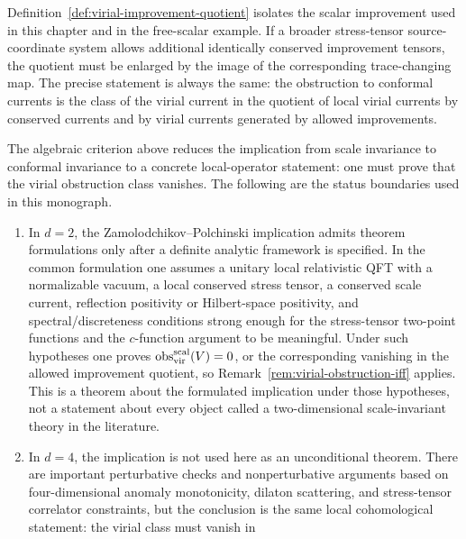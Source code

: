 \begin{remark}
\label{rem:general-improvement-obstruction}
Definition~\ref{def:virial-improvement-quotient} isolates the scalar
improvement used in this chapter and in the free-scalar example.  If a broader
stress-tensor source-coordinate system allows additional identically conserved improvement
tensors, the quotient must be enlarged by the image of the corresponding
trace-changing map.  The precise statement is always the same: the obstruction
to conformal currents is the class of the virial current in the quotient of
local virial currents by conserved currents and by virial currents generated by
allowed improvements.
\end{remark}

\begin{remark}
\label{rem:scale-conformal-dimension-status}
The algebraic criterion above reduces the implication from scale invariance to
conformal invariance to a concrete local-operator statement: one must prove
that the virial obstruction class vanishes.  The following are the status
boundaries used in this monograph.
\begin{enumerate}[label=(\alph*)]
\item In \(d=2\), the Zamolodchikov--Polchinski implication admits theorem
  formulations only after a definite analytic framework is specified.  In the
  common formulation one assumes a unitary local relativistic QFT with a
  normalizable vacuum, a local conserved stress tensor, a conserved scale
  current, reflection positivity or Hilbert-space positivity, and
  spectral/discreteness conditions strong enough for the stress-tensor
  two-point functions and the \(c\)-function argument to be meaningful.  Under
  such hypotheses one proves
  \({\rm obs}_{\rm vir}^{\rm scal}(V)=0\), or the corresponding vanishing in
  the allowed improvement quotient, so
  Remark~\ref{rem:virial-obstruction-iff} applies.  This is a theorem
  about the formulated implication under those hypotheses, not a statement
  about every object called a two-dimensional scale-invariant theory in the
  literature.
\item In \(d=4\), the implication is not used here as an unconditional
  theorem.  There are important perturbative checks and nonperturbative
  arguments based on four-dimensional anomaly monotonicity, dilaton
  scattering, and stress-tensor correlator constraints, but the conclusion
  is the same local cohomological statement: the virial class must vanish in

\end{enumerate}
\end{remark}

